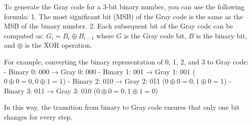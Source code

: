 To generate the Gray code for a 3-bit binary number, you can use the following formula:
1. The most significant bit (MSB) of the Gray code is the same as the MSB of the binary number.
2. Each subsequent bit of the Gray code can be computed as: \( G_i = B_i \oplus B_{i-1} \) where \( G \) is the Gray code bit, \( B \) is the binary bit, and \( \oplus \) is the XOR operation.

For example, converting the binary representation of 0, 1, 2, and 3 to Gray code:
- Binary 0: 000 → Gray 0: 000
- Binary 1: 001 → Gray 1: 001 ($0 \oplus 0 = 0, 0 \oplus 1 = 1$)
- Binary 2: 010 → Gray 2: 011 ($0 \oplus 0 = 0, 1 \oplus 0 = 1$)
- Binary 3: 011 → Gray 3: 010 ($0 \oplus 0 = 0, 1 \oplus 1 = 0$)

In this way, the transition from binary to Gray code ensures that only one bit changes for every step.

